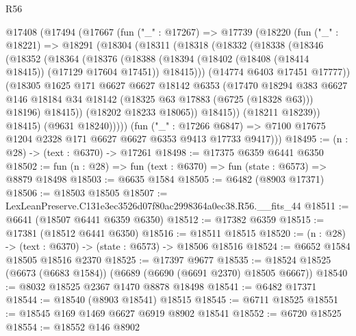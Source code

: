 \begin{lexlean}{R56}
\begin{coremodule}
  @17408
    (@17494
      (@17667
        (fun ("_" : @17267) =>
        @17739
          (@18220
            (fun ("_" : @18221) =>
            @18291
              (@18304
                (@18311
                  (@18318
                    (@18332
                      (@18338
                        (@18346
                          (@18352
                            (@18364
                              (@18376
                                (@18388
                                  (@18394
                                    (@18402 (@18408 (@18414 @18415)) (@17129 @17604 @17451))
                                    @18415)))
                              (@14774 @6403 @17451 @17777))
                            (@18305
                              @1625
                              @171
                              @6627
                              @6627
                              @18142
                              @6353
                              (@17470
                                @18294
                                @383
                                @6627
                                @146
                                @18184
                                @34
                                @18142
                                (@18325 @63 @17883 (@6725 (@18328 @63)))
                                @18196)
                              @18415))
                          (@18202 @18233 @18065))
                        @18415))
                    (@18211 @18239))
                  @18415)
                (@9631 @18240)))))
        (fun ("_" : @17266 @6847) =>
        @7100 @17675 @1204 @2328 @171 @6627 @6627 @6353 @9413 @17733 @9417)))
@18495 := (n : @28) -> (text : @6370) -> @17261
@18498 := @17375 @6359 @6441 @6350
@18502 := fun (n : @28) => fun (text : @6370) => fun (state : @6573) => @8879 @18498
@18503 := @6635 @1584
@18505 := @6482 (@8903 @17371)
@18506 := @18503 @18505
@18507 := LexLeanPreserve.C131e3ec3526d07f80ac2998364a0ec38.R56.__fits_44
@18511 := @6641 (@18507 @6441 @6359 @6350)
@18512 := @17382 @6359
@18515 := @17381 (@18512 @6441 @6350)
@18516 := @18511 @18515
@18520 := (n : @28) -> (text : @6370) -> (state : @6573) -> @18506 @18516
@18524 := @6652 @1584 @18505 @18516 @2370
@18525 := @17397 @9677
@18535 := @18524 @18525 (@6673 (@6683 @1584)) (@6689 (@6690 (@6691 @2370) @18505 @6667))
@18540 := @8032 @18525 @2367 @1470 @8878 @18498
@18541 := @6482 @17371
@18544 := @18540 (@8903 @18541) @18515
@18545 := @6711 @18525
@18551 := @18545 @169 @1469 @6627 @6919 @8902 @18541
@18552 := @6720 @18525
@18554 := @18552 @146 @8902

\end{coremodule}
\end{lexlean}
